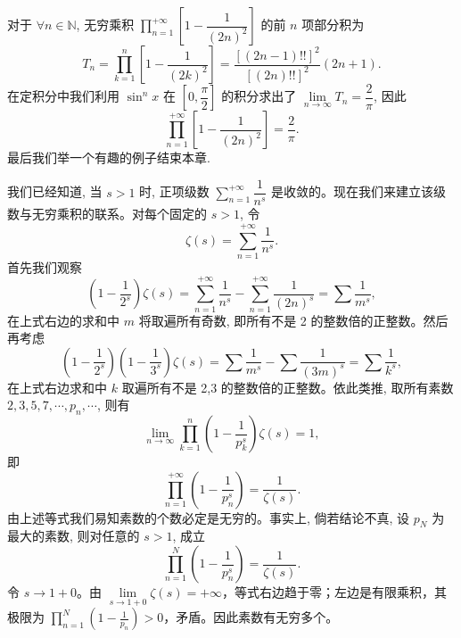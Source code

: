\begin{solve}
对于 $\forall n\in\mathbb{N}$, 无穷乘积 $\prod\limits_{n=1}^{+\infty}\left[1-\dfrac1{(2n)^2}\right]$ 的前 $n$ 项部分积为
\[
  T_n=\prod_{k=1}^n\left[1-\frac1{(2k)^2}\right]
  =\frac{[(2n-1)!!]^2}{[(2n)!!]^2}(2n+1).
\]
在定积分中我们利用 $\sin^n x$ 在 $\left[0,\dfrac{\pi}{2}\right]$ 的积分求出了 $\lim\limits_{n\to\infty}T_n=\dfrac2\pi$, 因此
\[
  \prod_{n=1}^{+\infty}\left[1-\frac1{(2n)^2}\right]=\frac2\pi.
\]
最后我们举一个有趣的例子结束本章.

我们已经知道, 当 $s>1$ 时, 正项级数 $\sum\limits_{n=1}^{+\infty}\dfrac1{n^s}$ 是收敛的。现在我们来建立该级数与无穷乘积的联系。对每个固定的 $s>1$, 令
\[
  \zeta(s)=\sum_{n=1}^{+\infty}\frac1{n^s}.
\]
首先我们观察
\[
  \left(1-\frac1{2^s}\right)\zeta(s)
  =\sum_{n=1}^{+\infty}\frac1{n^s}-\sum_{n=1}^{+\infty}\frac1{(2n)^s}
  =\sum\frac1{m^s},
\]
在上式右边的求和中 $m$ 将取遍所有奇数, 即所有不是 2 的整数倍的正整数。然后再考虑
\[
  \left(1-\frac1{2^s}\right)\left(1-\frac1{3^s}\right)\zeta(s)
  =\sum\frac1{m^s}-\sum\frac1{(3m)^s}
  =\sum\frac1{k^s},
\]
在上式右边求和中 $k$ 取遍所有不是 2,3 的整数倍的正整数。依此类推, 取所有素数 $2,3,5,7,\cdots,p_n,\cdots$, 则有
\[
  \lim_{n\to\infty}\prod_{k=1}^n\left(1-\frac1{p_k^s}\right)\zeta(s)=1,
\]
即
\[
  \prod_{n=1}^{+\infty}\left(1-\frac1{p_n^s}\right)=\frac1{\zeta(s)}.
\]
由上述等式我们易知素数的个数必定是无穷的。事实上, 倘若结论不真, 设 $p_N$ 为最大的素数, 则对任意的 $s>1$, 成立
\[
  \prod_{n=1}^N\left(1-\frac1{p_n^s}\right)=\frac1{\zeta(s)}.
\]
令 $s\to1+0$。由 $\lim\limits_{s\to1+0}\zeta(s)=+\infty$，等式右边趋于零；左边是有限乘积，其极限为 $\prod_{n=1}^N\left(1-\frac1{p_n}\right)>0$，矛盾。因此素数有无穷多个。
\end{solve}

